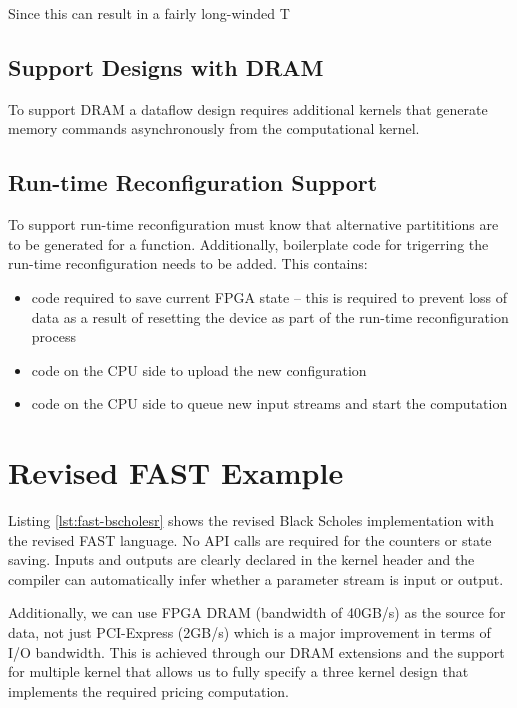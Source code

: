 Since this can result in a fairly long-winded
T

\subsection{Support Designs with DRAM}
\label{sec:fast-dram}

To support DRAM a dataflow design requires additional kernels that
generate memory commands asynchronously from the computational kernel.


\subsection{Run-time Reconfiguration Support}


To support run-time reconfiguration \fastc{} must know that
alternative partititions are to be generated for a function.
Additionally, boilerplate code for trigerring the run-time
reconfiguration needs to be added. This contains:
\begin{itemize}
\item code required to save current FPGA state -- this is required to
  prevent loss of data as a result of resetting the device as part of
  the run-time reconfiguration process
\item code on the CPU side to upload the new configuration
\item code on the CPU side to queue new input streams and start the
  computation
\end{itemize}



\section{Revised FAST Example}
\label{sec:fast-ref}

Listing \ref{lst:fast-bscholesr} shows the revised Black Scholes
implementation with the revised FAST language. No API calls are
required for the counters or state saving. Inputs and outputs are
clearly declared in the kernel header and the compiler can
automatically infer whether a parameter stream is input or output.

Additionally, we can use FPGA DRAM (bandwidth of 40GB/s) as the source
for data, not just PCI-Express (2GB/s) which is a major improvement in
terms of I/O bandwidth. This is achieved through our DRAM extensions
and the support for multiple kernel that allows us to fully specify a
three kernel design that implements the required pricing computation.

